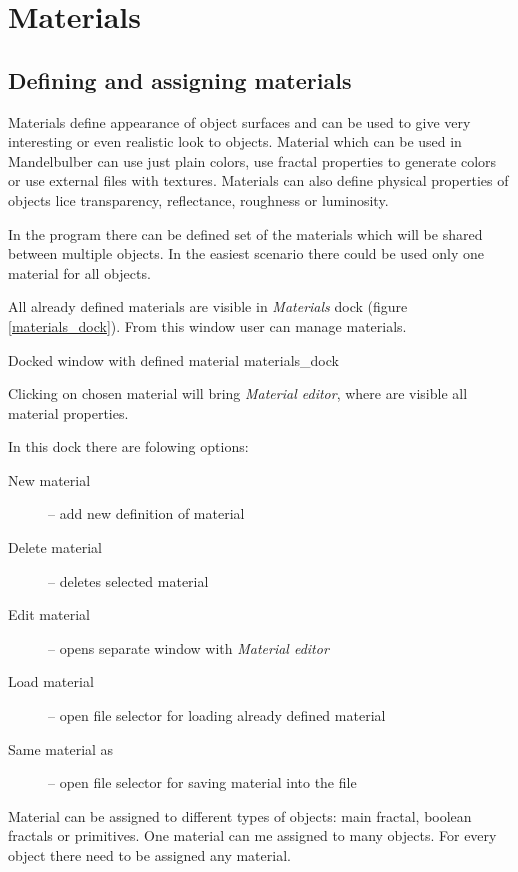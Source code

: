\section{Materials}\label{materials}

\subsection{Defining and assigning materials}\label{defining-materials}

Materials define appearance of object surfaces and can be used to give very interesting or even realistic look to objects. Material which can be used in Mandelbulber can use just plain colors, use fractal properties to generate colors or use external files with textures. Materials can also define physical properties of objects lice transparency, reflectance, roughness or luminosity. 

In the program there can be defined set of the materials which will be shared between multiple objects. In the easiest scenario there could be used only one material for all objects.

All already defined materials are visible in \emph{Materials} dock (figure \ref{materials_dock}).
From this window user can manage materials.

{Docked window with defined material}
{materials_dock}

Clicking on chosen material will bring \emph{Material editor}, where are visible all material properties.

In this dock there are folowing options:

\begin{description}
		\item[New material] -- add new definition of material
		\item[Delete material] -- deletes selected material
		\item[Edit material] -- opens separate window with \emph{Material editor}
		\item[Load material] -- open file selector for loading already defined material
		\item[Same material as] -- open file selector for saving material into the file
\end{description}

Material can be assigned to different types of objects: main fractal, boolean fractals or primitives. One material can me assigned to many objects. For every object there need to be assigned any material.

